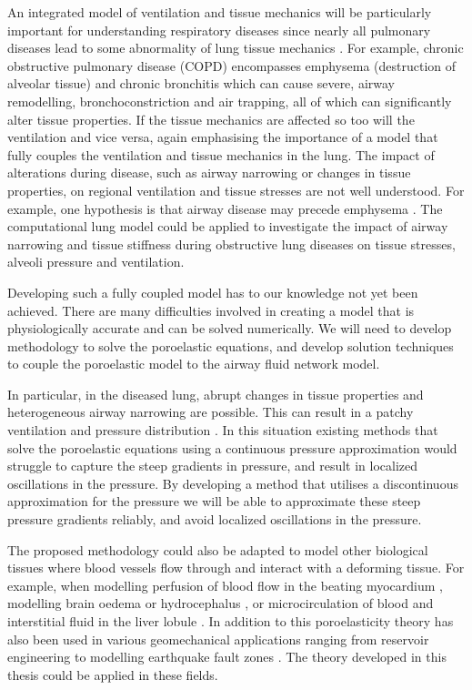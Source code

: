 An integrated model of ventilation and tissue mechanics will be particularly important for understanding respiratory diseases since nearly all pulmonary diseases lead to some abnormality of lung tissue mechanics \citep{suki2011lung}. For example, chronic obstructive pulmonary disease (COPD) encompasses emphysema (destruction of alveolar tissue) and chronic bronchitis which can cause severe, airway remodelling, bronchoconstriction and air trapping, all of which can significantly alter tissue properties. If the tissue mechanics are affected so too will the ventilation and vice versa, again emphasising the importance of a model that fully couples the ventilation and tissue mechanics in the lung. The impact of alterations during disease, such as airway narrowing or changes in tissue properties, on regional ventilation and tissue stresses are not well understood. For example, one hypothesis is that airway disease may precede emphysema \citep{galban2012computed}. The computational lung model could be applied to investigate the impact of airway narrowing and tissue stiffness during obstructive lung diseases on tissue stresses, alveoli pressure and ventilation.

Developing such a fully coupled model has to our knowledge not yet been achieved. There are many difficulties involved in creating a model that is physiologically accurate and can be solved numerically. We will need to develop methodology to solve the poroelastic equations, and develop solution techniques to couple the poroelastic model to the airway fluid network model.

In particular, in the diseased lung, abrupt changes in tissue properties and heterogeneous airway narrowing are possible. This can result in a patchy ventilation and pressure distribution \citep{venegas2005self}. In this situation existing methods that solve the poroelastic equations using a continuous pressure approximation would struggle to capture the steep gradients in pressure, and result in localized oscillations in the pressure. By developing a method that utilises a discontinuous approximation for the pressure we will be able to approximate these steep pressure gradients reliably, and avoid localized oscillations in the pressure.%

The proposed methodology could also be adapted to model other biological tissues where blood vessels flow through and interact with a deforming tissue. For example, when modelling perfusion of blood flow in the beating myocardium \citep{chapelle2010poroelastic,cookson2011novel}, modelling brain oedema \citep{li2010three} or hydrocephalus \citep{wirth2006axisymmetric}, or microcirculation of blood and interstitial fluid in the liver lobule \citep{leungchavaphongse2013mathematical}. In addition to this poroelasticity theory has also been used in various geomechanical applications ranging from reservoir engineering \citep{phillips2007coupling} to modelling earthquake fault zones \citep{white2008stabilized}. The theory developed in this thesis could be applied in these fields.


